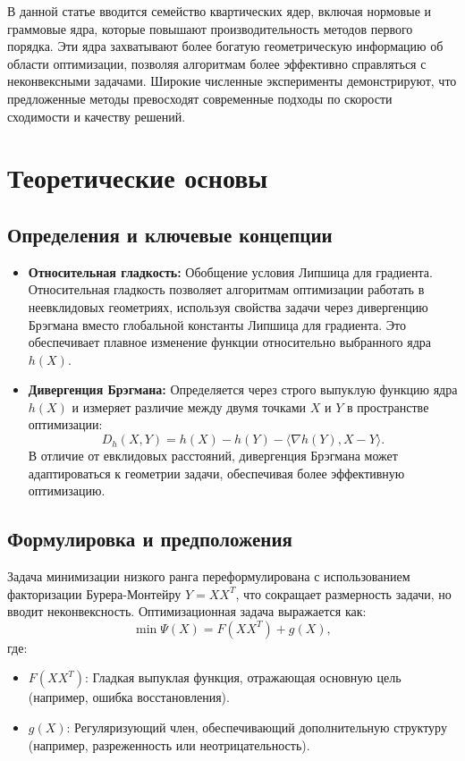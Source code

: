 \documentclass[a4paper,11pt]{article}
\begin{document}
В данной статье вводится семейство квартических ядер, включая нормовые и граммовые ядра, которые повышают производительность методов первого порядка. Эти ядра захватывают более богатую геометрическую информацию об области оптимизации, позволяя алгоритмам более эффективно справляться с неконвексными задачами. Широкие численные эксперименты демонстрируют, что предложенные методы превосходят современные подходы по скорости сходимости и качеству решений.

\section{Теоретические основы}
\subsection{Определения и ключевые концепции}
\begin{itemize}
    \item \textbf{Относительная гладкость:} Обобщение условия Липшица для градиента. Относительная гладкость позволяет алгоритмам оптимизации работать в неевклидовых геометриях, используя свойства задачи через дивергенцию Брэгмана вместо глобальной константы Липшица для градиента. Это обеспечивает плавное изменение функции относительно выбранного ядра \(h(X)\).
    \item \textbf{Дивергенция Брэгмана:} Определяется через строго выпуклую функцию ядра \(h(X)\) и измеряет различие между двумя точками \(X\) и \(Y\) в пространстве оптимизации:
    \[
    D_h(X, Y) = h(X) - h(Y) - \langle \nabla h(Y), X - Y \rangle.
    \]
    В отличие от евклидовых расстояний, дивергенция Брэгмана может адаптироваться к геометрии задачи, обеспечивая более эффективную оптимизацию.
\end{itemize}

\subsection{Формулировка и предположения}
Задача минимизации низкого ранга переформулирована с использованием факторизации Бурера-Монтейру \(Y = XX^T\), что сокращает размерность задачи, но вводит неконвексность. Оптимизационная задача выражается как:
\[
\min \Psi(X) = F(XX^T) + g(X),
\]
где:
\begin{itemize}
    \item \(F(XX^T)\): Гладкая выпуклая функция, отражающая основную цель (например, ошибка восстановления).
    \item \(g(X)\): Регуляризующий член, обеспечивающий дополнительную структуру (например, разреженность или неотрицательность).
\end{itemize}
\end{document}
